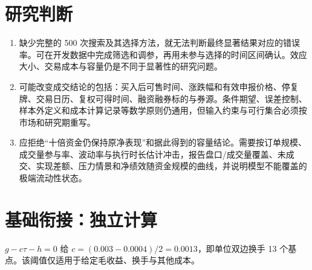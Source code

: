 \section*{研究判断}
\begin{enumerate}[leftmargin=*]
  \item 缺少完整的 500 次搜索及其选择方法，就无法判断最终显著结果对应的错误率。可在开发数据中完成筛选和调参，再用未参与选择的时间区间确认。效应大小、交易成本与容量仍是不同于显著性的研究问题。
  \item 可能改变成交结论的包括：买入后可售时间、涨跌幅和有效申报价格、停复牌、交易日历、复权可得时间、融资融券标的与券源。条件期望、误差控制、样本外定义和成本计算记录等数学原则仍通用，但输入约束与可行集合必须按市场和研究期重写。
  \item 应拒绝“十倍资金仍保持原净表现”和据此得到的容量结论。需要按订单规模、成交量参与率、波动率与执行时长估计冲击，报告盘口/成交量覆盖、未成交、实现差额、压力情景和净绩效随资金规模的曲线，并说明模型不能覆盖的极端流动性状态。
\end{enumerate}

\section*{基础衔接：独立计算}
$g-c\tau-h=0$ 给 $c=(0.003-0.0004)/2=0.0013$，即单位双边换手 13 个基点。该阈值仅适用于给定毛收益、换手与其他成本。
